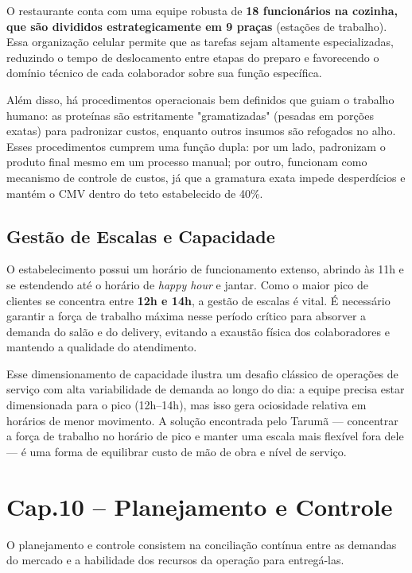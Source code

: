 \documentclass[12pt, a4paper]{article}
\begin{document}
O restaurante conta com uma equipe robusta de \textbf{18 funcionários na cozinha, que são divididos estrategicamente em 9 praças} (estações de trabalho). Essa organização celular permite que as tarefas sejam altamente especializadas, reduzindo o tempo de deslocamento entre etapas do preparo e favorecendo o domínio técnico de cada colaborador sobre sua função específica.

Além disso, há procedimentos operacionais bem definidos que guiam o trabalho humano: as proteínas são estritamente "gramatizadas" (pesadas em porções exatas) para padronizar custos, enquanto outros insumos são refogados no alho. Esses procedimentos cumprem uma função dupla: por um lado, padronizam o produto final mesmo em um processo manual; por outro, funcionam como mecanismo de controle de custos, já que a gramatura exata impede desperdícios e mantém o CMV dentro do teto estabelecido de 40\%.

\subsection{Gestão de Escalas e Capacidade}

O estabelecimento possui um horário de funcionamento extenso, abrindo às 11h e se estendendo até o horário de \textit{happy hour} e jantar. Como o maior pico de clientes se concentra entre \textbf{12h e 14h}, a gestão de escalas é vital. É necessário garantir a força de trabalho máxima nesse período crítico para absorver a demanda do salão e do delivery, evitando a exaustão física dos colaboradores e mantendo a qualidade do atendimento.

Esse dimensionamento de capacidade ilustra um desafio clássico de operações de serviço com alta variabilidade de demanda ao longo do dia: a equipe precisa estar dimensionada para o pico (12h–14h), mas isso gera ociosidade relativa em horários de menor movimento. A solução encontrada pelo Tarumã — concentrar a força de trabalho no horário de pico e manter uma escala mais flexível fora dele — é uma forma de equilibrar custo de mão de obra e nível de serviço.

\section{Cap.10 – Planejamento e Controle}

O planejamento e controle consistem na conciliação contínua entre as demandas do mercado e a habilidade dos recursos da operação para entregá-las. 
\end{document}
